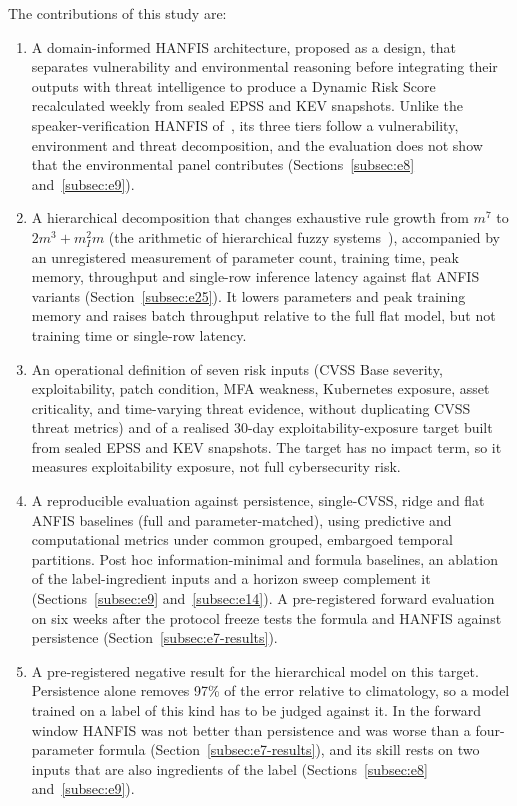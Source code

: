 \documentclass[referee,lineno,pdflatex,sn-basic]{sn-jnl}%
\theoremstyle{thmstyleone}%
\theoremstyle{thmstyletwo}%
\theoremstyle{thmstylethree}%
\begin{document}
The contributions of this study are:
\begin{enumerate}
    \item[\textbf{C1.}] A domain-informed HANFIS architecture, proposed as a design, that separates vulnerability and environmental reasoning before integrating their outputs with threat intelligence to produce a Dynamic Risk Score recalculated weekly from sealed EPSS and KEV snapshots. Unlike the speaker-verification HANFIS of~\citet{soozanchi2010hanfis}, its three tiers follow a vulnerability, environment and threat decomposition, and the evaluation does not show that the environmental panel contributes (Sections~\ref{subsec:e8} and~\ref{subsec:e9}).
    \item[\textbf{C2.}] A hierarchical decomposition that changes exhaustive rule growth from $m^{7}$ to $2m^{3}+m_I^{2}m$ (the arithmetic of hierarchical fuzzy systems~\citealp{raju1991,wang1998hierarchical}), accompanied by an unregistered measurement of parameter count, training time, peak memory, throughput and single-row inference latency against flat ANFIS variants (Section~\ref{subsec:e25}). It lowers parameters and peak training memory and raises batch throughput relative to the full flat model, but not training time or single-row latency.
    \item[\textbf{C3.}] An operational definition of seven risk inputs (CVSS Base severity, exploitability, patch condition, MFA weakness, Kubernetes exposure, asset criticality, and time-varying threat evidence, without duplicating CVSS threat metrics) and of a realised 30-day exploitability-exposure target built from sealed EPSS and KEV snapshots. The target has no impact term, so it measures exploitability exposure, not full cybersecurity risk.
    \item[\textbf{C4.}] A reproducible evaluation against persistence, single-CVSS, ridge and flat ANFIS baselines (full and parameter-matched), using predictive and computational metrics under common grouped, embargoed temporal partitions. Post hoc information-minimal and formula baselines, an ablation of the label-ingredient inputs and a horizon sweep complement it (Sections~\ref{subsec:e9} and~\ref{subsec:e14}). A pre-registered forward evaluation on six weeks after the protocol freeze tests the formula and HANFIS against persistence (Section~\ref{subsec:e7-results}).
    \item[\textbf{C5.}] A pre-registered negative result for the hierarchical model on this target. Persistence alone removes 97\% of the error relative to climatology, so a model trained on a label of this kind has to be judged against it. In the forward window HANFIS was not better than persistence and was worse than a four-parameter formula (Section~\ref{subsec:e7-results}), and its skill rests on two inputs that are also ingredients of the label (Sections~\ref{subsec:e8} and~\ref{subsec:e9}).
\end{enumerate}
\end{document}
